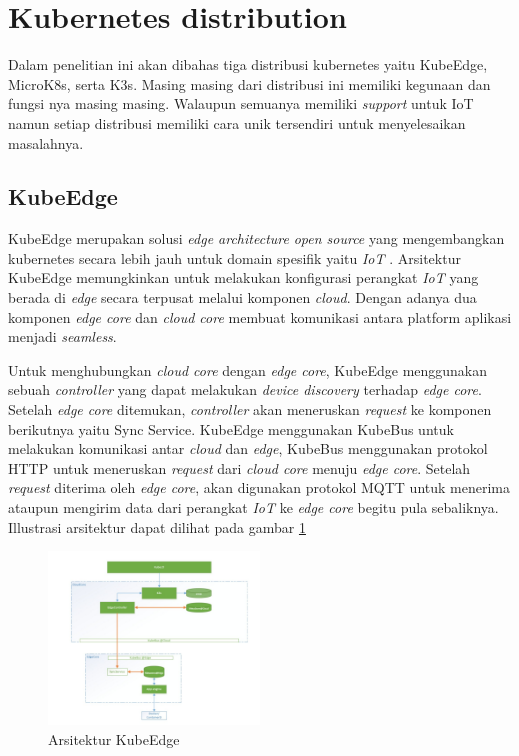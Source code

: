 \section{Kubernetes distribution}
Dalam penelitian ini akan dibahas tiga distribusi kubernetes yaitu KubeEdge, MicroK8s, serta K3s. Masing masing dari distribusi ini memiliki kegunaan dan fungsi nya masing masing. Walaupun semuanya memiliki \textit{support} untuk IoT namun setiap distribusi memiliki cara unik tersendiri untuk menyelesaikan masalahnya.

\subsection{KubeEdge}
KubeEdge merupakan solusi \textit{edge architecture} \textit{open source} yang mengembangkan kubernetes secara lebih jauh untuk domain spesifik yaitu \textit{IoT} \parencite{kubeedge}. Arsitektur KubeEdge memungkinkan untuk melakukan konfigurasi perangkat \textit{IoT} yang berada di \textit{edge} secara terpusat melalui komponen \textit{cloud}. Dengan adanya dua komponen \textit{edge core} dan \textit{cloud core} membuat komunikasi antara platform aplikasi menjadi \textit{seamless}.

Untuk menghubungkan \textit{cloud core} dengan \textit{edge core}, KubeEdge menggunakan sebuah \textit{controller} yang dapat melakukan \textit{device discovery} terhadap \textit{edge core}. Setelah \textit{edge core} ditemukan, \textit{controller} akan meneruskan \textit{request} ke komponen berikutnya yaitu Sync Service. KubeEdge menggunakan KubeBus untuk melakukan komunikasi antar \textit{cloud} dan \textit{edge}, KubeBus menggunakan protokol HTTP untuk meneruskan \textit{request} dari \textit{cloud core} menuju \textit{edge core}. Setelah \textit{request} diterima oleh \textit{edge core}, akan digunakan protokol MQTT untuk menerima ataupun mengirim data dari perangkat \textit{IoT} ke \textit{edge core} begitu pula sebaliknya. Illustrasi arsitektur dapat dilihat pada gambar \ref*{fig:arsitektur-kube-edge}

\begin{figure}[ht]
  \centering
  \includegraphics[width=0.5\textwidth]{resources/chapter-2/arsitektur-kube-edge.jpg}
  \caption{Arsitektur KubeEdge \parencite{kubeedge}}
  \label{fig:arsitektur-kube-edge}
\end{figure}

